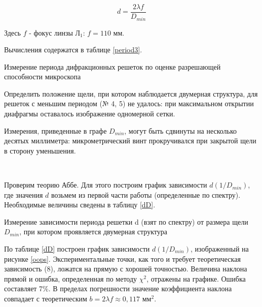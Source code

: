 \documentclass[12pt]{kiarticle} %
\begin{document}
	\[ d = \frac{2\lambda f}{D_{min}} \]
	
	Здесь $f$ - фокус линзы $\text{Л}_1$: $f = 110$ мм.  
	
	Вычисления содержатся в таблице \ref{period3}. 
	
	\begin{table}[h]
		\centering
		
		\caption{Измерение периода дифракционных решеток по оценке разрешающей способности микроскопа}
		\label{period3}
	\end{table}	
	
	Определить положение щели, при котором наблюдается двумерная структура, для решеток с меньшим периодом (№ 4, 5) не удалось: при максимальном открытии диафрагмы оставалось изображение одномерной сетки. 
	
	Измерения, приведенные в графе $D_{min}$, могут быть сдвинуты на несколько десятых миллиметра: микрометрический винт прокручивался при закрытой щели в сторону уменьшения.
	
	\
		
	Проверим теорию Аббе. Для этого построим график зависимости $d(1/D_{min})$, где значения $d$ возьмем из первой части работы (определенные по спектру). Необходимые величины сведены в таблицу \ref{dD}. 
	
	\begin{table}[h]
		\centering
		
		\caption{Измерение зависимости периода решетки d (взят по спектру) от размера щели $D_{min}$, при котором проявляется двумерная структура}
		\label{dD}
	\end{table}	
	
	По таблице \ref{dD} построен график зависимости $d(1/D_{min})$, изображенный на рисунке \ref{oops}. Экспериментальные точки, как того и требует теоретическая зависимость (8), ложатся на прямую с хорошей точностью. Величина наклона прямой и ошибка, определенная по методу $\chi^2$, отражены на графике. Ошибка составляет 7\%. В пределах погрешности значение коэффициента наклона совпадает с теоретическим $b = 2\lambda f \approx 0,117 \text{ мм}^2$.
	
\end{document}
